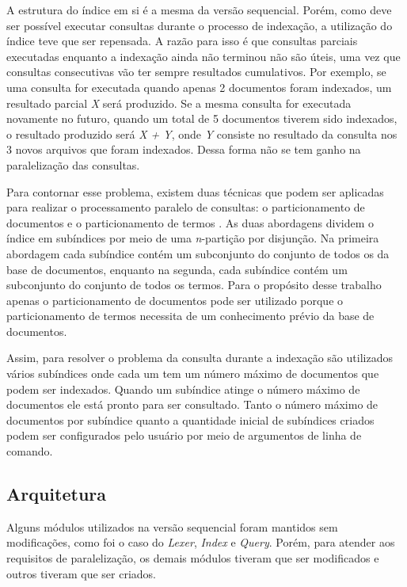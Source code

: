 A estrutura do índice em si é a mesma da versão sequencial. Porém, como deve ser possível executar consultas durante o processo de indexação, a utilização do índice teve que ser repensada. A razão para isso é que consultas parciais executadas enquanto a indexação ainda não terminou não são úteis, uma vez que consultas consecutivas vão ter sempre resultados cumulativos. Por exemplo, se uma consulta for executada quando apenas 2 documentos foram indexados, um resultado parcial \emph{X} será produzido. Se a mesma consulta for executada novamente no futuro, quando um total de 5 documentos tiverem sido indexados, o resultado produzido será \emph{X + Y}, onde \emph{Y} consiste no resultado da consulta nos 3 novos arquivos que foram indexados. Dessa forma não se tem ganho na paralelização das consultas.

Para contornar esse problema, existem duas técnicas que podem ser aplicadas para realizar o processamento paralelo de consultas: o particionamento de documentos e o particionamento de termos \cite{buttcher2010information}. As duas abordagens dividem o índice em subíndices por meio de uma \emph{n}-partição por disjunção. Na primeira abordagem cada subíndice contém um subconjunto do conjunto de todos os da base de documentos, enquanto na segunda, cada subíndice contém um subconjunto do conjunto de todos os termos. Para o propósito desse trabalho apenas o particionamento de documentos pode ser utilizado porque o particionamento de termos necessita de um conhecimento prévio da base de documentos.

Assim, para resolver o problema da consulta durante a indexação são utilizados vários subíndices onde cada um tem um número máximo de documentos que podem ser indexados. Quando um subíndice atinge o número máximo de documentos ele está pronto para ser consultado. Tanto o número máximo de documentos por subíndice quanto a quantidade inicial de subíndices criados podem ser configurados pelo usuário por meio de argumentos de linha de comando.

\subsection{Arquitetura}

Alguns módulos utilizados na versão sequencial foram mantidos sem modificações, como foi o caso do \emph{Lexer}, \emph{Index} e \emph{Query}. Porém, para atender aos requisitos de paralelização, os demais módulos tiveram que ser modificados e outros tiveram que ser criados.

